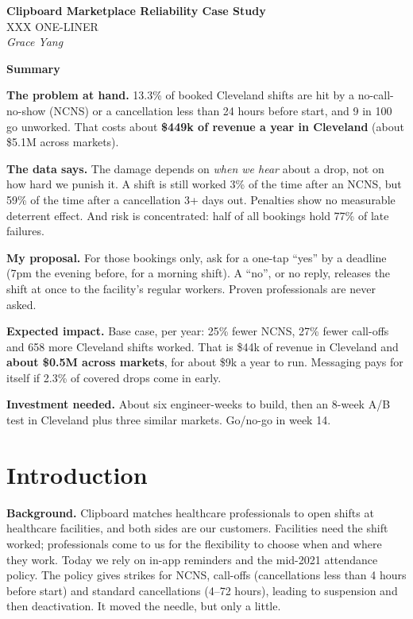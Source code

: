\documentclass[11pt]{article}
\begin{document}
{\LARGE\bfseries Clipboard Marketplace Reliability Case Study}\\[2pt]
{\large XXX ONE-LINER}\\[4pt]
\textit{Grace Yang}

\begin{callout}
\setlength{\parskip}{2pt}
\textbf{Summary}

\textbf{The problem at hand.} 13.3\% of booked Cleveland shifts are hit by a no-call-no-show (NCNS) or a cancellation
less than 24 hours before start, and 9 in 100 go unworked. That costs about \textbf{\$449k of revenue a year in
Cleveland} (about \$5.1M across markets).

\textbf{The data says.} The damage depends on \emph{when we hear} about a drop, not on how hard we punish it. A shift is
still worked 3\% of the time after an NCNS, but 59\% of the time after a cancellation 3+ days out. Penalties show no
measurable deterrent effect. And risk is concentrated: half of all bookings hold 77\% of late failures.

\textbf{My proposal.} For those bookings only, ask for a one-tap ``yes'' by a deadline (7pm the evening before, for a
morning shift). A ``no'', or no reply, releases the shift at once to the facility's regular workers. Proven
professionals are never asked.

\textbf{Expected impact.} Base case, per year: 25\% fewer NCNS, 27\% fewer call-offs and 658 more Cleveland shifts
worked. That is \$44k of revenue in Cleveland and \textbf{about \$0.5M across markets}, for about \$9k a year to run.
Messaging pays for itself if 2.3\% of covered drops come in early.

\textbf{Investment needed.} About six engineer-weeks to build, then an 8-week A/B test in Cleveland plus three similar
markets. Go/no-go in week 14.
\end{callout}

\section{Introduction}

\textbf{Background.} Clipboard matches healthcare professionals to open shifts at healthcare facilities, and both sides
are our customers. Facilities need the shift worked; professionals come to us for the flexibility to choose when and
where they work. Today we rely on in-app reminders and the mid-2021 attendance policy. The policy gives strikes for NCNS,
call-offs (cancellations less than 4 hours before start) and standard cancellations (4--72 hours), leading to suspension
and then deactivation. It moved the needle, but only a little.
\end{document}
